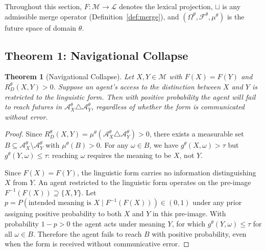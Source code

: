\documentclass[12pt]{article}
\theoremstyle{rthm}
\newtheorem{theorem}{Theorem}[section]
\theoremstyle{rdef}
\theoremstyle{remark}
\newcommand{\M}{\mathcal{M}}
\newcommand{\Lc}{\mathcal{L}}
\newcommand{\A}{\mathcal{A}}
\newcommand{\Om}{\Omega}
\newcommand{\RD}[1][\theta]{R_{D}^{#1}}
\begin{document}
Throughout this section, $F : \M \to \Lc$ denotes the lexical projection,
$\sqcup$ is any admissible merge operator (Definition~\ref{def:merge}), and
$(\Om^{\theta}, \mathcal{F}^{\theta}, \mu^{\theta})$ is the future space of
domain $\theta$.

\subsection{Theorem 1: Navigational Collapse}
\label{subsec:t1}

\begin{theorem}[Navigational Collapse]
\label{thm:collapse}
Let $X, Y \in \M$ with $F(X) = F(Y)$ and $\RD(X,Y) > 0$. Suppose an agent's
access to the distinction between $X$ and $Y$ is restricted to the linguistic
form. Then with positive probability the agent will fail to reach futures in
$\A_X^{\theta} \triangle \A_Y^{\theta}$, regardless of whether the form is
communicated without error.
\end{theorem}

\begin{proof}
Since $\RD(X,Y) = \mu^{\theta}(\A_X^{\theta} \triangle \A_Y^{\theta}) > 0$,
there exists a measurable set $B \subseteq \A_X^{\theta} \setminus \A_Y^{\theta}$
with $\mu^{\theta}(B) > 0$. For any $\omega \in B$, we have
$g^{\theta}(X, \omega) > \tau$ but $g^{\theta}(Y, \omega) \leq \tau$: reaching
$\omega$ requires the meaning to be $X$, not $Y$.

Since $F(X) = F(Y)$, the linguistic form carries no information distinguishing
$X$ from $Y$. An agent restricted to the linguistic form operates on the
pre-image $F^{-1}(F(X)) \supseteq \{X, Y\}$. Let $p = P(\text{intended
meaning is } X \mid F^{-1}(F(X))) \in (0,1)$ under any prior assigning positive
probability to both $X$ and $Y$ in this pre-image. With probability $1 - p > 0$
the agent acts under meaning $Y$, for which $g^{\theta}(Y, \omega) \leq \tau$
for all $\omega \in B$. Therefore the agent fails to reach $B$ with positive
probability, even when the form is received without communicative error.
\end{proof}
\end{document}
